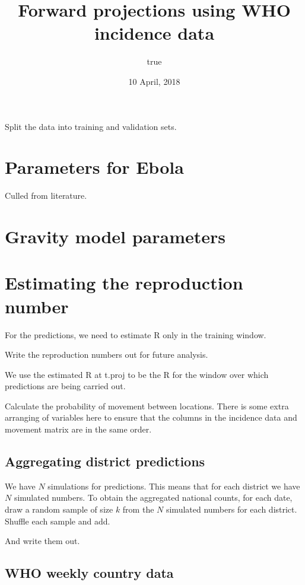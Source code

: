 \documentclass[11pt,]{article}
\title{Forward projections using WHO incidence data}
\author{true}
\date{10 April, 2018}
\begin{document}
\maketitle

Split the data into training and validation sets.

\section{Parameters for Ebola}\label{parameters-for-ebola}

Culled from literature.

\section{Gravity model parameters}\label{gravity-model-parameters}

\section{Estimating the reproduction
number}\label{estimating-the-reproduction-number}

For the predictions, we need to estimate R only in the training window.

Write the reproduction numbers out for future analysis.

We use the estimated R at t.proj to be the R for the window over which
predictions are being carried out.

Calculate the probability of movement between locations. There is some
extra arranging of variables here to ensure that the columns in the
incidence data and movement matrix are in the same order.

\subsection{Aggregating district
predictions}\label{aggregating-district-predictions}

We have \(N\) simulations for predictions. This means that for each
district we have \(N\) simulated numbers. To obtain the aggregated
national counts, for each date, draw a random sample of size \(k\) from
the \(N\) simulated numbers for each district. Shuffle each sample and
add.

And write them out.

\subsection{WHO weekly country data}\label{who-weekly-country-data}
\end{document}
